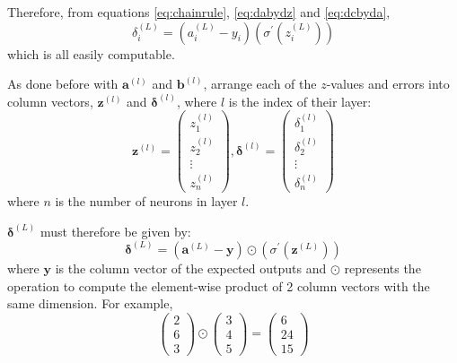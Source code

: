 \documentclass[12pt]{report}
\begin{document}
Therefore, from equations \ref{eq:chainrule}, \ref{eq:dabydz} and \ref{eq:dcbyda},
\begin{equation}
    {\delta}^{\left(L\right)}_i=\left(a^{\left(L\right)}_i-y_i\right)\left({\sigma}^{\prime} \left(z^{\left(L\right)}_i\right)\right)
\end{equation}
which is all easily computable.

As done before with $\mathbf{a}^{\left(l\right)}$ and $\mathbf{b}^{\left(l\right)}$, arrange each of the $z$-values and errors into column vectors, $\mathbf{z}^{\left(l\right)}$ and $\bm{\delta}^{\left(l\right)}$, where $l$ is the index of their layer:
\begin{equation}
    \mathbf{z}^{\left(l\right)}=\begin{pmatrix}z^{\left(l\right)}_1\\[0.3em]z^{\left(l\right)}_2\\\vdots \\z^{\left(l\right)}_n\end{pmatrix},\bm{\delta}^{\left(l\right)}=\begin{pmatrix}{\delta}^{\left(l\right)}_1\\[0.3em]{\delta}^{\left(l\right)}_2\\\vdots \\{\delta}^{\left(l\right)}_n\end{pmatrix}
\end{equation}
where $n$ is the number of neurons in layer $l$.

$\bm{\delta}^{\left(L\right)}$ must therefore be given by:
\begin{equation}\label{eq:errorOutputLayer}
    \bm{\delta}^{\left(L\right)}=\left(\mathbf{a}^{\left(L\right)}-\mathbf{y}\right)\odot \left({\sigma}^{\prime} \left(\mathbf{z}^{\left(L\right)}\right)\right)
\end{equation}
where $\mathbf{y}$ is the column vector of the expected outputs and $\odot$ represents the operation to compute the element-wise product of 2 column vectors with the same dimension. For example,
\begin{equation}
    \begin{pmatrix}2\\6\\3\end{pmatrix}\odot \begin{pmatrix}3\\4\\5\end{pmatrix}=\begin{pmatrix}6\\24\\15\end{pmatrix}
\end{equation}
\end{document}
